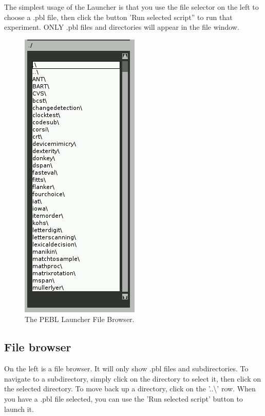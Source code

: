 The simplest usage of the Launcher is that you use the file selector on
the left to choose a .pbl file, then click the button 'Run selected
script'' to run that experiment.  ONLY .pbl files and directories will
appear in the file window.
\clearpage
{}

\begin{figure}
 \vspace{-40pt}
  \begin{center}
    \includegraphics[scale=.5]{images/filebrowser.png} 
  \end{center}
  \caption{The PEBL Launcher File Browser.}
 \vspace{-50pt}
\end{figure}
\subsection{File browser}
On the left is a file browser.  It will only show .pbl files and
subdirectories.  To navigate to a subdirectory, simply click on the
directory to select it, then click on the selected directory.  To move
back up a directory, click on the '..\textbackslash' row.  When you have a .pbl file
selected, you can use the 'Run selected script' button to launch it.


